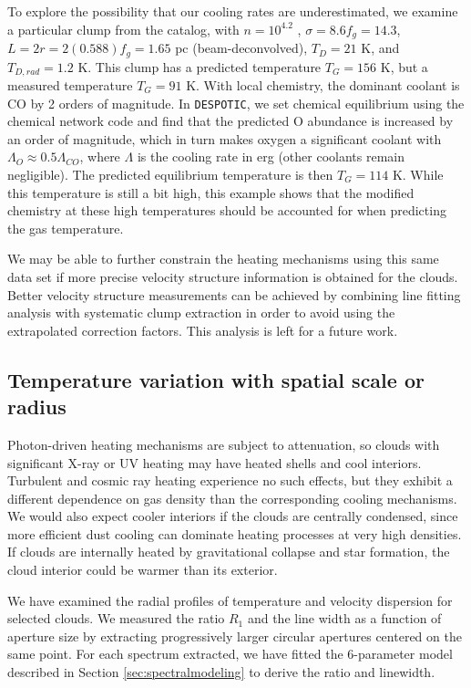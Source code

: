 To explore the possibility that our cooling rates are underestimated, we
examine a particular clump from the catalog, with $n=10^{4.2}$ \percc,
$\sigma=8.6 f_g = 14.3$\kms, $L = 2r = 2(0.588)f_g = 1.65$ pc
(beam-deconvolved), $T_D=21$ K, and $T_{D,rad} = 1.2$ K.  This clump has a
predicted temperature $T_{G}=156$ K, but a measured temperature $T_{G}=91$
K.  With local chemistry, the dominant coolant is CO by 2 orders of magnitude.
In \texttt{DESPOTIC}, we set chemical equilibrium using the \citet{Nelson1999a}
chemical network code and find that the predicted O abundance is increased by
an order of magnitude, which in turn makes oxygen a significant coolant with
$\Lambda_{O} \approx 0.5 \Lambda_{CO}$, where $\Lambda$ is the cooling rate in
erg \pers \percc (other coolants remain negligible).   The predicted
equilibrium temperature is then $T_{G}=114$ K.  While this temperature is
still a bit high, this example shows that the modified chemistry at these high
temperatures should be accounted for when predicting the gas temperature.

We may be able to further constrain the heating mechanisms using this same data
set if more precise velocity structure information is obtained for the clouds.
Better velocity structure measurements can be achieved by combining line
fitting analysis with systematic clump extraction in order to avoid using the
extrapolated correction factors.  This analysis is left for a future work.



\subsection{Temperature variation with spatial scale or radius}
Photon-driven heating mechanisms are subject to attenuation, so clouds with
significant X-ray or UV heating may have heated shells and cool interiors.
Turbulent and cosmic ray heating experience no such effects, but they exhibit a
different dependence on gas density than the corresponding cooling mechanisms.
We would also expect cooler interiors if the clouds are centrally condensed, since
more efficient dust cooling can dominate heating processes at very high
densities.  If clouds are internally heated by gravitational collapse and star
formation, the cloud interior could be warmer than its exterior.  

We have examined the radial profiles of temperature and velocity
dispersion for selected clouds.  We measured the ratio $R_1$ and the line width
as a function of aperture size by extracting progressively larger circular
apertures centered on the same point.  For each spectrum extracted, we have
fitted the 6-parameter model described in Section \ref{sec:spectralmodeling} to
derive the ratio and linewidth.

